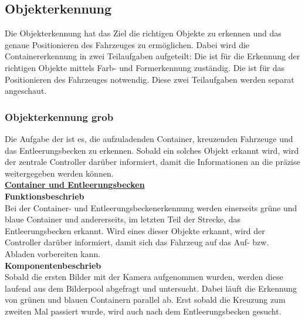 \subsection{Objekterkennung}
Die Objekterkennung hat das Ziel die richtigen Objekte zu erkennen und das genaue Positionieren des Fahrzeuges zu ermöglichen. Dabei wird die Containererkennung in zwei Teilaufgaben aufgeteilt: Die \grqq{} ist für die Erkennung der richtigen Objekte mittels Farb- und Formerkennung zuständig. Die \grqq{} ist für das Positionieren des Fahrzeuges notwendig. Diese zwei Teilaufgaben werden separat angeschaut.
%
\subsubsection{Objekterkennung grob}
Die Aufgabe der \grqq ist es, die aufzuladenden Container, kreuzenden Fahrzeuge und das Entleerungsbecken zu erkennen. Sobald ein solches Objekt erkannt wird, wird der zentrale Controller darüber informiert, damit die Informationen an die \grqq{} präzise weitergegeben werden können.
\\[0.2cm]
\underline{\textbf{Container und Entleerungsbecken}}
\\[0.2cm]
\textbf{Funktionsbeschrieb}\\[0.2cm]
Bei der Container- und Entleerungsbeckenerkennung werden einerseits grüne und blaue Container und andererseits, im letzten Teil der Strecke, das Entleerungsbecken erkannt. Wird eines dieser Objekte erkannt, wird der Controller darüber informiert, damit sich das Fahrzeug auf das Auf- bzw. Abladen vorbereiten kann.
\\[0.2cm]
\textbf{Komponentenbeschrieb}\\[0.2cm]
Sobald die ersten Bilder mit der Kamera aufgenommen wurden, werden diese laufend aus dem Bilderpool abgefragt und untersucht. Dabei läuft die Erkennung von grünen und blauen Containern parallel ab. Erst sobald die Kreuzung zum zweiten Mal passiert wurde, wird auch nach dem Entleerungsbecken gesucht.
